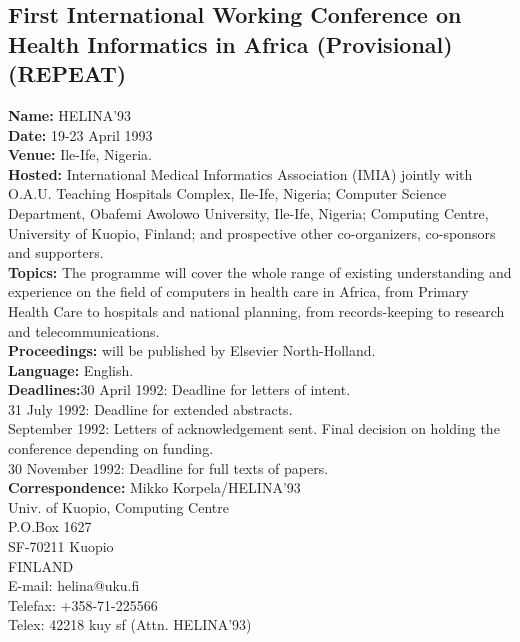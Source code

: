 \subsection{First International Working Conference on Health
Informatics in Africa (Provisional) (REPEAT)} 
{\bf Name:} HELINA'93 \\
{\bf Date:} 19-23 April 1993\\
{\bf Venue:} Ile-Ife, Nigeria.\\
{\bf Hosted:} International Medical Informatics Association (IMIA)
jointly with O.A.U. Teaching Hospitals Complex, Ile-Ife, Nigeria;
Computer Science Department, Obafemi Awolowo University, Ile-Ife,
Nigeria; Computing Centre, University of Kuopio, Finland; and
prospective other co-organizers, co-sponsors and supporters.  \\
{\bf Topics:} The programme will cover the whole range of existing
understanding and experience on the field of computers in health care
in Africa, from Primary Health Care to hospitals and national
planning, from records-keeping to research and telecommunications.\\
{\bf Proceedings:} will be published by Elsevier North-Holland.\\
{\bf Language:} English.\\
{\bf Deadlines:}30 April 1992:      Deadline for letters of intent.\\
31 July 1992:       Deadline for extended abstracts.\\
September 1992:     Letters of acknowledgement sent. Final decision on
                    holding the conference depending on funding.\\
30 November 1992:   Deadline for full texts of papers.\\
{\bf Correspondence:}
Mikko Korpela/HELINA'93\\
Univ. of Kuopio, Computing Centre\\
P.O.Box 1627\\
SF-70211 Kuopio\\
FINLAND\\
E-mail:     helina@uku.fi\\
Telefax:    +358-71-225566\\
Telex:      42218 kuy sf (Attn. HELINA'93)


